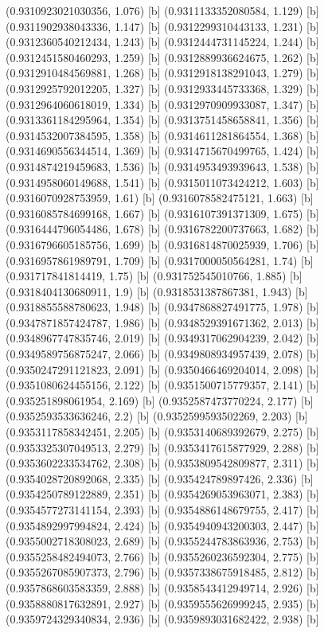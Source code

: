{{{(0.9310923021030356, 1.076) [b] 
(0.9311133352080584, 1.129) [b] 
(0.9311902938043336, 1.147) [b] 
(0.9312299310443133, 1.231) [b] 
(0.9312360540212434, 1.243) [b] 
(0.9312444731145224, 1.244) [b] 
(0.9312451580460293, 1.259) [b] 
(0.9312889936624675, 1.262) [b] 
(0.9312910484569881, 1.268) [b] 
(0.9312918138291043, 1.279) [b] 
(0.9312925792012205, 1.327) [b] 
(0.9312933445733368, 1.329) [b] 
(0.9312964060618019, 1.334) [b] 
(0.9312970909933087, 1.347) [b] 
(0.9313361184295964, 1.354) [b] 
(0.9313751458658841, 1.356) [b] 
(0.9314532007384595, 1.358) [b] 
(0.9314611281864554, 1.368) [b] 
(0.9314690556344514, 1.369) [b] 
(0.9314715670499765, 1.424) [b] 
(0.9314874219459683, 1.536) [b] 
(0.9314953493939643, 1.538) [b] 
(0.9314958060149688, 1.541) [b] 
(0.9315011073424212, 1.603) [b] 
(0.9316070928753959, 1.61) [b] 
(0.9316078582475121, 1.663) [b] 
(0.9316085784699168, 1.667) [b] 
(0.9316107391371309, 1.675) [b] 
(0.9316444796054486, 1.678) [b] 
(0.9316782200737663, 1.682) [b] 
(0.9316796605185756, 1.699) [b] 
(0.9316814870025939, 1.706) [b] 
(0.9316957861989791, 1.709) [b] 
(0.9317000050564281, 1.74) [b] 
(0.931717841814419, 1.75) [b] 
(0.931752545010766, 1.885) [b] 
(0.9318404130680911, 1.9) [b] 
(0.9318531387867381, 1.943) [b] 
(0.9318855588780623, 1.948) [b] 
(0.9347868827491775, 1.978) [b] 
(0.9347871857424787, 1.986) [b] 
(0.9348529391671362, 2.013) [b] 
(0.9348967747835746, 2.019) [b] 
(0.9349317062904239, 2.042) [b] 
(0.9349589756875247, 2.066) [b] 
(0.9349808934957439, 2.078) [b] 
(0.9350247291121823, 2.091) [b] 
(0.9350466469204014, 2.098) [b] 
(0.9351080624455156, 2.122) [b] 
(0.9351500715779357, 2.141) [b] 
(0.935251898061954, 2.169) [b] 
(0.9352587473770224, 2.177) [b] 
(0.9352593533636246, 2.2) [b] 
(0.9352599593502269, 2.203) [b] 
(0.9353117858342451, 2.205) [b] 
(0.9353140689392679, 2.275) [b] 
(0.9353325307049513, 2.279) [b] 
(0.9353417615877929, 2.288) [b] 
(0.9353602233534762, 2.308) [b] 
(0.9353809542809877, 2.311) [b] 
(0.9354028720892068, 2.335) [b] 
(0.935424789897426, 2.336) [b] 
(0.9354250789122889, 2.351) [b] 
(0.9354269053963071, 2.383) [b] 
(0.9354577273141154, 2.393) [b] 
(0.9354886148679755, 2.417) [b] 
(0.9354892997994824, 2.424) [b] 
(0.9354940943200303, 2.447) [b] 
(0.9355002718308023, 2.689) [b] 
(0.9355244783863936, 2.753) [b] 
(0.9355258482494073, 2.766) [b] 
(0.9355260236592304, 2.775) [b] 
(0.9355267085907373, 2.796) [b] 
(0.9357338675918485, 2.812) [b] 
(0.9357868603583359, 2.888) [b] 
(0.9358543412949714, 2.926) [b] 
(0.9358880817632891, 2.927) [b] 
(0.9359555626999245, 2.935) [b] 
(0.9359724329340834, 2.936) [b] 
(0.9359893031682422, 2.938) [b] 
}}}
